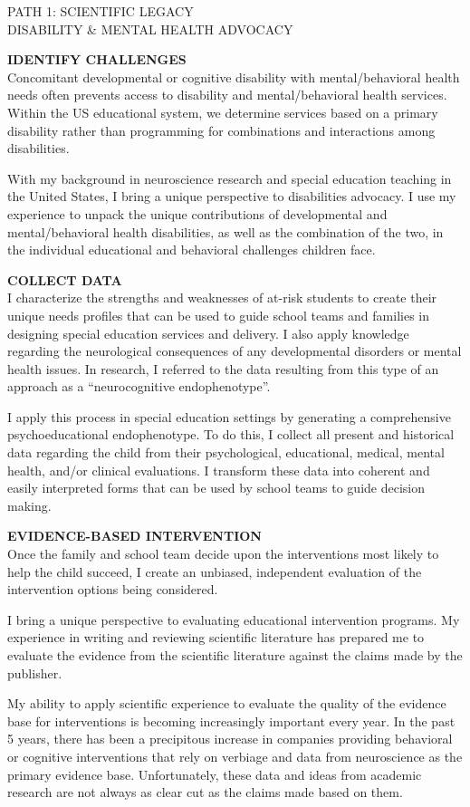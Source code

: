 \documentclass{resume} %
\begin{document}
\begin{rSection}{PATH 1: SCIENTIFIC LEGACY\\DISABILITY \& MENTAL HEALTH ADVOCACY}

{\bf IDENTIFY CHALLENGES}\\
Concomitant developmental or cognitive disability with mental/behavioral health needs often prevents access to disability and mental/behavioral health services. Within the US educational system, we determine services based on a primary disability rather than programming for combinations and interactions among disabilities.

With my background in neuroscience research and special education teaching in the United States, I bring a unique perspective to disabilities advocacy. I use my experience to unpack the unique contributions of developmental and mental/behavioral health disabilities, as well as the combination of the two, in the individual educational and behavioral challenges children face.

{\bf COLLECT DATA}\\
I characterize the strengths and weaknesses of at-risk students to create their unique needs profiles that can be used to guide school teams and families in designing special education services and delivery. I also apply knowledge regarding the neurological consequences of any developmental disorders or mental health issues. In research, I referred to the data resulting from this type of an approach as a “neurocognitive endophenotype”.

I apply this process in special education settings by generating a comprehensive psychoeducational endophenotype. To do this, I collect all present and historical data regarding the child from their psychological, educational, medical, mental health, and/or clinical evaluations. I transform these data into coherent and easily interpreted forms that can be used by school teams to guide decision making.

{\bf EVIDENCE-BASED INTERVENTION}\\
Once the family and school team decide upon the interventions most likely to help the child succeed, I create an unbiased, independent evaluation of the intervention options being considered.

I bring a unique perspective to evaluating educational intervention programs. My experience in writing and reviewing scientific literature has prepared me to evaluate the evidence from the scientific literature against the claims made by the publisher.

My ability to apply scientific experience to evaluate the quality of the evidence base for interventions is becoming increasingly important every year. In the past 5 years, there has been a precipitous increase in companies providing behavioral or cognitive interventions that rely on verbiage and data from neuroscience as the primary evidence base. Unfortunately, these data and ideas from academic research are not always as clear cut as the claims made based on them.
\end{rSection}
\end{document}
